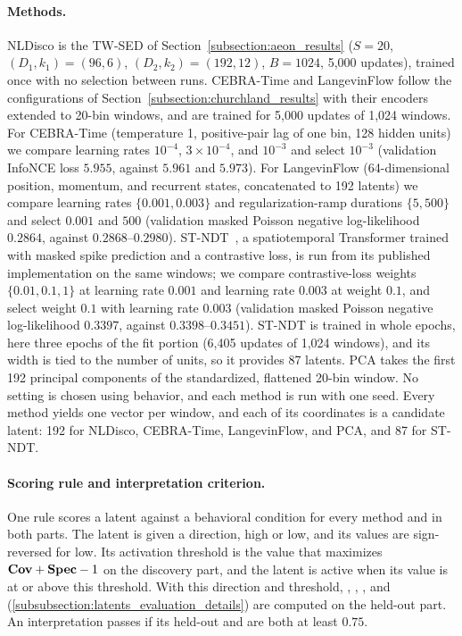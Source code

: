 \paragraph{Methods.}
NLDisco is the TW-SED of Section~\ref{subsection:aeon_results} ($S=20$, $(D_1,k_1)=(96,6)$, $(D_2,k_2)=(192,12)$, $B=1024$, 5,000 updates), trained once with no selection between runs. CEBRA-Time and LangevinFlow follow the configurations of Section~\ref{subsection:churchland_results} with their encoders extended to 20-bin windows, and are trained for 5,000 updates of 1,024 windows. For CEBRA-Time (temperature 1, positive-pair lag of one bin, 128 hidden units) we compare learning rates $10^{-4}$, $3\times10^{-4}$, and $10^{-3}$ and select $10^{-3}$ (validation InfoNCE loss $5.955$, against $5.961$ and $5.973$). For LangevinFlow (64-dimensional position, momentum, and recurrent states, concatenated to 192 latents) we compare learning rates $\{0.001, 0.003\}$ and regularization-ramp durations $\{5, 500\}$ and select $0.001$ and $500$ (validation masked Poisson negative log-likelihood $0.2864$, against $0.2868$--$0.2980$). ST-NDT~\citep{le_2022_stndt}, a spatiotemporal Transformer trained with masked spike prediction and a contrastive loss, is run from its published implementation on the same windows; we compare contrastive-loss weights $\{0.01, 0.1, 1\}$ at learning rate $0.001$ and learning rate $0.003$ at weight $0.1$, and select weight $0.1$ with learning rate $0.003$ (validation masked Poisson negative log-likelihood $0.3397$, against $0.3398$--$0.3451$). ST-NDT is trained in whole epochs, here three epochs of the fit portion (6,405 updates of 1,024 windows), and its width is tied to the number of units, so it provides 87 latents. PCA takes the first 192 principal components of the standardized, flattened 20-bin window. No setting is chosen using behavior, and each method is run with one seed. Every method yields one vector per window, and each of its coordinates is a candidate latent: 192 for NLDisco, CEBRA-Time, LangevinFlow, and PCA, and 87 for ST-NDT.

\paragraph{Scoring rule and interpretation criterion.}
One rule scores a latent against a behavioral condition for every method and in both parts. The latent is given a direction, high or low, and its values are sign-reversed for low. Its activation threshold is the value that maximizes $\mathbf{Cov}+\mathbf{Spec}-1$ on the discovery part, and the latent is active when its value is at or above this threshold. With this direction and threshold, , , , and  (\hyperref[subsubsection:latents_evaluation_details]{\ref*{subsubsection:latents_evaluation_details}}) are computed on the held-out part. An interpretation passes if its held-out  and  are both at least $0.75$.


